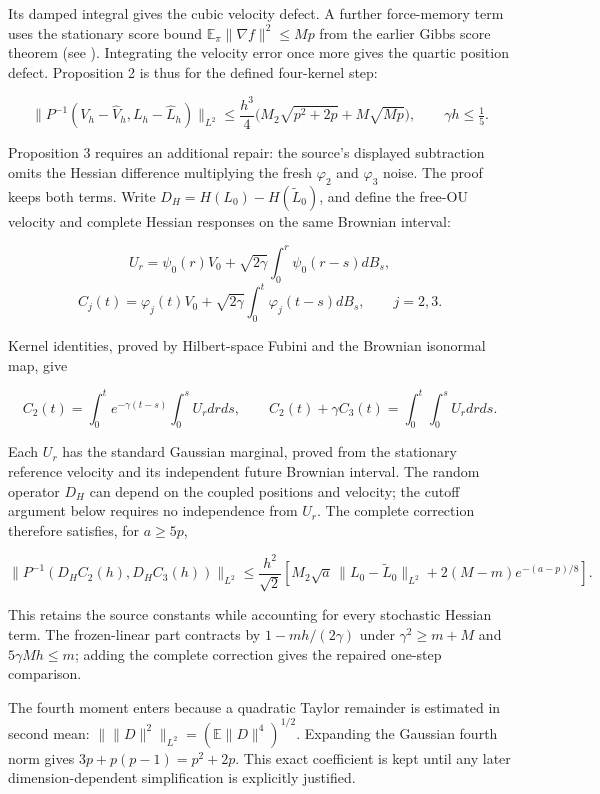 \documentclass[11pt,a4paper]{report}
\begin{document}
Its damped integral gives the cubic velocity defect. A further force-memory
term uses the stationary score bound
\(\mathbb E_\pi\|\nabla f\|^2\le Mp\) from the earlier Gibbs score theorem (see \cite[Section~3.27.8]{LangevinLean2026ULASC}). Integrating the velocity error
once more gives the quartic position defect. Proposition 2 is thus for the defined four-kernel step:


\[\|P^{-1}(V_h-\hat V_h,L_h-\hat L_h)\|_{L^2}
\le\frac{h^3}{4}\bigl(M_2\sqrt{p^2+2p}+M\sqrt{Mp}\bigr),
\qquad \gamma h\le\tfrac15.\]


Proposition 3 requires an additional repair: the source's displayed
subtraction omits the Hessian difference multiplying the fresh
\(\varphi_2\) and \(\varphi_3\) noise. The proof keeps both terms.
Write \(D_H=H(L_0)-H(\widetilde L_0)\), and define the free-OU velocity
and complete Hessian responses on the same Brownian interval:


\[U_r=\psi_0(r)V_0+\sqrt{2\gamma}\int_0^r\psi_0(r-s)dB_s,\]
\[C_j(t)=\varphi_j(t)V_0+\sqrt{2\gamma}
\int_0^t\varphi_j(t-s)dB_s,\qquad j=2,3.\]


Kernel identities, proved by Hilbert-space Fubini and the Brownian
isonormal map, give


\[C_2(t)=\int_0^te^{-\gamma(t-s)}\int_0^sU_rdrds,
\qquad C_2(t)+\gamma C_3(t)=\int_0^t\int_0^sU_rdrds.\]


Each \(U_r\) has the standard Gaussian marginal, proved from the stationary reference velocity and its independent future Brownian interval.
The random operator \(D_H\) can depend on the coupled positions and velocity;
the cutoff argument below requires no independence from \(U_r\). The complete
correction therefore satisfies, for \(a\ge5p\),


\[\|P^{-1}(D_HC_2(h),D_HC_3(h))\|_{L^2}
\le\frac{h^2}{\sqrt2}\left[
M_2\sqrt a\,\|L_0-\widetilde L_0\|_{L^2}
+2(M-m)e^{-(a-p)/8}\right].\]


This retains the source constants while accounting for every stochastic
Hessian term. The frozen-linear part contracts by \(1-mh/(2\gamma)\)
under \(\gamma^2\ge m+M\) and \(5\gamma Mh\le m\); adding the complete
correction gives the repaired one-step comparison.



The fourth moment enters because a quadratic Taylor remainder is estimated in second mean: \(\|\|D\|^2\|_{L^2}=(\mathbb E\|D\|^4)^{1/2}\). Expanding the Gaussian fourth norm gives \(3p+p(p-1)=p^2+2p\). This exact coefficient is kept until any later dimension-dependent simplification is explicitly justified.
\end{document}
